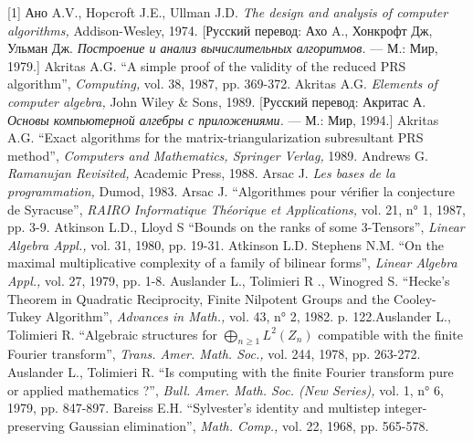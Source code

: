 \documentclass{../../template/mai_book}
\begin{document}
[1] Ано A.V., Hopcroft J.E., Ullman J.D. {\itshape The design and analysis of computer algorithms,} Addison-Wesley, 1974. [Русский перевод: Ахо A., Хонкрофт Дж, Ульман Дж. {\itshape Построение и анализ вычислительных алгоритмов.} — М.: Мир, 1979.] \newline
[2] Akritas A.G. “A simple proof of the validity of the reduced PRS algorithm”, {\itshape Computing,} vol. 38, 1987, pp. 369-372. \newline
[3] Akritas A.G. {\itshape Elements of computer algebra,} John Wiley \&  Sons, 1989. [Русский перевод: Акритас А. {\itshape Основы компьютерной алгебры с приложениями.} — М.: Мир, 1994.] \newline
[4] Akritas A.G. “Exact algorithms for the matrix-triangularization subresultant PRS method”, {\itshape Computers and Mathematics, Springer Verlag,} 1989. \newline
[5] Andrews G. {\itshape Ramanujan Revisited,} Academic Press, 1988. \newline
[6] Arsac J. {\itshape Les bases de la programmation,} Dumod, 1983. \newline
[7] Arsac J. “Algorithmes pour v\'{e}rifier la conjecture de Syracuse”, {\itshape RAIRO Informatique Th\'{e}orique et Applications, } vol. 21, n° 1, 1987, pp. 3-9. \newline
[8] Atkinson L.D., Lloyd S “Bounds on the ranks of some 3-Tensors”, {\itshape Linear Algebra Appl.,} vol. 31, 1980, pp. 19-31. \newline
[9] Atkinson L.D. Stephens N.M. “On the maximal multiplicative complexity of a family of bilinear forms”, {\itshape Linear Algebra Appl.,} vol. 27, 1979,
pp. 1-8. \newline
[10] Auslander L., Tolimieri R ., Winogred S. “Hecke’s Theorem in Quadratic Reciprocity, Finite Nilpotent Groups and the Cooley-Tukey Algorithm”, {\itshape Advances in Math.,} vol. 43, n° 2, 1982. p. 122.\newline
[11] Auslander L., Tolimieri R. “Algebraic structures for $\bigoplus_{n\geqslant1}L^2(Z_{n})$ compatible with the finite Fourier transform”, {\itshape Trans. Amer. Math. Soc.,} vol. 244, 1978, pp. 263-272. \newline
[12] Auslander L., Tolimieri R. “Is computing with the finite Fourier transform pure or applied mathematics ?”, {\itshape Bull. Amer. Math. Soc. (New Series),} vol. 1, n° 6, 1979, pp. 847-897. \newline
[13] Bareiss E.H. “Sylvester’s identity and multistep integer-preserving Gaussian elimination”, {\itshape Math. Comp.,} vol. 22, 1968, pp. 565-578.\newline
\end{document}
